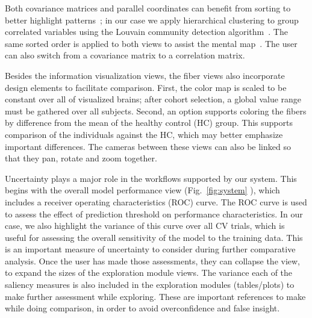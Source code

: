 Both covariance matrices and parallel coordinates can benefit from sorting to better highlight patterns~\cite{1382895}; in our case we apply hierarchical clustering to group correlated variables using the Louvain community detection algorithm~\cite{donetti2004detecting}. The same sorted order is applied to both views to assist the mental map~\cite{1215004}. The user can also switch from a covariance matrix to a correlation matrix.

Besides the information visualization views, the fiber views also incorporate design elements to facilitate comparison. First, the color map is scaled to be constant over all of visualized brains; after cohort selection, a global value range must be gathered over all subjects. Second, an option supports coloring the fibers by difference from the mean of the healthy control (HC) group. This supports comparison of the individuals against the HC, which may better emphasize important differences. The cameras between these views can also be linked so that they pan, rotate and zoom together. 

Uncertainty plays a major role in the workflows supported by our system. This begins with the overall model performance view (Fig.~\ref{fig:system} ), which includes a receiver operating characteristics (ROC) curve. The ROC curve is used to assess the effect of prediction threshold on performance characteristics. In our case, we also highlight the variance of this curve over all CV trials, which is useful for assessing the overall sensitivity of the model to the training data. This is an important measure of uncertainty to consider during further comparative analysis. Once the user has made those assessments, they can collapse the view, to expand the sizes of the exploration module views. The variance each of the saliency measures is also included in the exploration modules (tables/plots) to make further assessment while exploring. These are important references to make while doing comparison, in order to avoid overconfidence and false insight.
